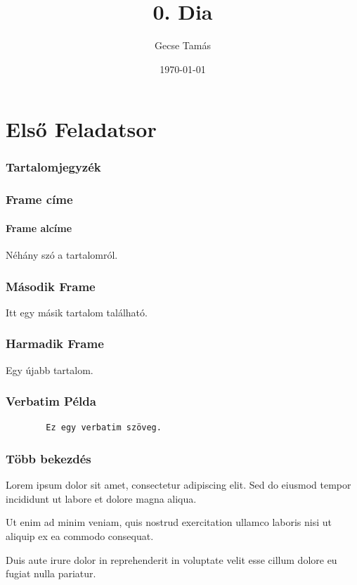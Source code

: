 \documentclass[12pt, aspectratio=169]{beamer}
\title{0. Dia}
\author{Gecse Tamás}
\date{\today}
\begin{document}
\begin{frame}
    \titlepage
\end{frame}

\section{Első Feladatsor}

\begin{frame}
    \frametitle{Tartalomjegyzék}
\end{frame}

\begin{frame}
    \frametitle{Frame címe}
    \framesubtitle{Frame alcíme}
    Néhány szó a tartalomról.
\end{frame}

\begin{frame}
    \frametitle{Második Frame}
    Itt egy másik tartalom található.
\end{frame}

\begin{frame}
    \frametitle{Harmadik Frame}
    Egy újabb tartalom.
\end{frame}

\begin{frame}[fragile]
    \frametitle{Verbatim Példa}
    \begin{verbatim}
        Ez egy verbatim szöveg.
    \end{verbatim}
\end{frame}

\begin{frame}[allowframebreaks]
    \frametitle{Több bekezdés}
    Lorem ipsum dolor sit amet, consectetur adipiscing elit. Sed do eiusmod tempor incididunt ut labore et dolore magna aliqua. 
    
    Ut enim ad minim veniam, quis nostrud exercitation ullamco laboris nisi ut aliquip ex ea commodo consequat.
    
    Duis aute irure dolor in reprehenderit in voluptate velit esse cillum dolore eu fugiat nulla pariatur.
\end{frame}
\end{document}
